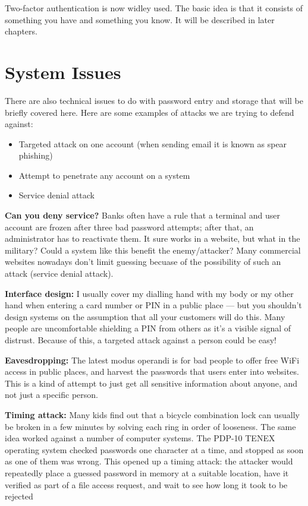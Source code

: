 	Two-factor authentication is now widley used. The basic idea is that it consists
	of something you have and something you know. It will be described in later chapters. 

\clearpage
\section{System Issues}

	There are also technical issues to do with password entry and storage that will 
	be briefly covered here. Here are some examples of attacks we are trying to defend against:

	\begin{itemize}
		\item Targeted attack on one account (when sending email it is known as spear phishing)
		\item Attempt to penetrate any account on a system
		\item Service denial attack
	\end{itemize}

	{\bf Can you deny service?} Banks often have a rule that a terminal and user account
	are frozen after three bad password attempts; after that, an administrator has to 
	reactivate them. It sure works in a website, but what in the military? Could a system
	like this benefit the enemy/attacker? Many commercial websites nowadays don't limit guessing
	becuase of the possibility of such an attack (service denial attack).

	{\bf Interface design: } I usually cover my dialling hand with my body or my other hand when
	entering a card number or PIN in a public place — but you shouldn’t design
	systems on the assumption that all your customers will do this. Many people
	are uncomfortable shielding a PIN from others as it’s a visible signal of distrust.
	Because of this, a targeted attack against a person could be easy!

	{\bf Eavesdropping: } The latest modus operandi is for bad people
	to offer free WiFi access in public places, and harvest the passwords that
	users enter into websites. This is a kind of attempt to just get all sensitive information
	about anyone, and not just a specific person. 

	{\bf Timing attack: }Many kids find out that a bicycle combination lock can usually be 
	broken in a few minutes by solving each ring in order of looseness. The same idea
	worked against a number of computer systems. The PDP-10 TENEX operating
	system checked passwords one character at a time, and stopped as soon as
	one of them was wrong. This opened up a timing attack: the attacker would
	repeatedly place a guessed password in memory at a suitable location, have it
	verified as part of a file access request, and wait to see how long it took to be
	rejected


